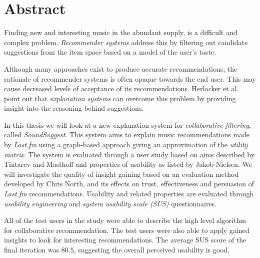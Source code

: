 \chapter*{Abstract}\label{chapter:summary:english}


Finding new and interesting music in the abundant supply, is a difficult and complex problem. \emph{Recommender systems} address this by filtering out candidate suggestions from the item space based on a model of the user's taste\cite{song:2012}.

Although many approaches exist to produce accurate recommendations, the rationale of recommender systems is often opaque towards the end user. This may cause decreased levels of acceptance of its recommendations. Herlocker et al. \cite{herlocker:2000} point out that \emph{explanation systems} can overcome this problem by providing insight into the reasoning behind suggestions.

In this thesis we will look at a new explanation system for \emph{collaborative filtering}, called \emph{SoundSuggest}. This system aims to explain  music recommendations made by \emph{Last.fm} using a graph-based approach giving an approximation of the \emph{utility matrix}. The system is evaluated through a user study based on aims described by Tintarev and Masthoff\cite{tintarev:2007:SER:1547550.1547664} and properties of usability as listed by Jakob Nielsen\cite{nielsen:1993:UE:529793}. We will investigate the quality of insight gaining based on an evaluation method developed by Chris North\cite{north:2006}, and its effects on trust, effectiveness and persuasion of \emph{Last.fm} recommendations. Usability and related properties are evaluated through \emph{usability engineering} and \emph{system usability scale (SUS)} questionnaires.

All of the test users in the study were able to describe the high level algorithm for collaborative recommendation. The test users were also able to apply gained insights to look for interesting recommendations. The average SUS score of the final iteration was $80.5$, suggesting the overall perceived usability is good. %